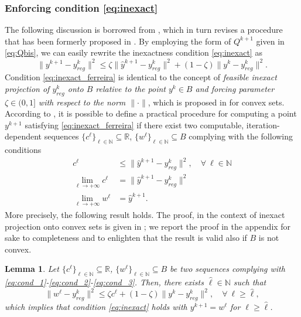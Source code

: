 \documentclass[pdflatex,sn-mathphys-num]{sn-jnl}
\numberwithin{equation}{section}%
\def\R{\mathbb{R}}
\def\N{\mathbb{N}}
\newcommand{\yck}{{y_{reg}^k}}
\newcommand{\REV}[1]{\textcolor{black}{#1}}
\theoremstyle{thmstyleone}%
\newtheorem{lemma}[theorem]{Lemma}%
\theoremstyle{thmstyletwo}%
\theoremstyle{thmstylethree}%
\begin{document}
\subsubsection{Enforcing condition \eqref{eq:inexact}}
The following discussion is borrowed from \cite[Section 2.1.1]{Ferreira-2022}, which in turn revises a procedure that has been formerly proposed in \cite{Birgin2003}.
{By employing the form of $Q^{k+1}$ given in \eqref{eq:Qbis}}, we can easily rewrite the inexactness condition \eqref{eq:inexact} as
\begin{equation}\label{eq:inexact_ferreira}
    \|y^{k+1}-\yck\|^2\leq \zeta \|\hat{y}^{k+1}-\yck\|^2+(1-\zeta)\|y^k-\yck\|^2.
\end{equation}
Condition \eqref{eq:inexact_ferreira} is identical to the concept of {\it feasible inexact projection of $\yck$ onto $B$ relative to the point $y^k\in B$ and forcing parameter $\zeta\in(0,1]$ with respect to the norm $\|\cdot\|$}, which is proposed in \cite[Definition 2]{Ferreira-2022} for convex sets. According to \cite[Section 2.1.1]{Ferreira-2022},  it is possible to define a practical procedure for computing a point $y^{k+1}$ satisfying \eqref{eq:inexact_ferreira} if there exist two computable, iteration-dependent sequences $\{c^\ell\}_{\ell \in \mathbb{N}} \subseteq \R$, $\{w^\ell\}_{\ell \in \mathbb{N}} \subseteq B$ complying with the following conditions
\begin{subequations}
    \begin{align}
        c^\ell &\le \|\hat{y}^{k+1}-\yck\|^2, \quad \forall \ \ell \in \mathbb{N} \label{eq:cond_1} \\
        \lim_{\ell \rightarrow +\infty} c^\ell & = \|\hat{y}^{k+1}-\yck\|^2 \label{eq:cond_2} \\
        \lim_{\ell \rightarrow +\infty} w^\ell & = \hat{y}^{k+1}. \label{eq:cond_3}
    \end{align}
\end{subequations}
More precisely, the following result holds. The  proof, in the context of inexact projection onto convex sets is given in \cite[Section 2.1.1]{Ferreira-2022}; we report the proof in the appendix for sake to completeness and to enlighten that the result is valid also if $B$ is not convex. 
\begin{lemma}\label{lem:stopping}
    Let $\{c^\ell\}_{\ell \in \mathbb{N}} \subseteq \R$, $\{w^\ell\}_{\ell \in \mathbb{N}} \subseteq B$ be two sequences complying with \eqref{eq:cond_1}-\eqref{eq:cond_2}-\eqref{eq:cond_3}. Then, there exists $\hat{\ell}\in \N$ such that
    \begin{equation}\label{eq:stopping}
        \|w^{{\ell}}-\yck\|^2\leq \zeta c^{{\ell}}+(1-\zeta)\|y^k-\yck\|^2,\quad \forall \ \ell\ge \hat{\ell},
    \end{equation}
    which implies that condition \REV{\eqref{eq:inexact}} holds with $y^{k+1}=w^{{\ell}}$ for $\ell\ge \hat{\ell}$.  
\end{lemma}
\end{document}
